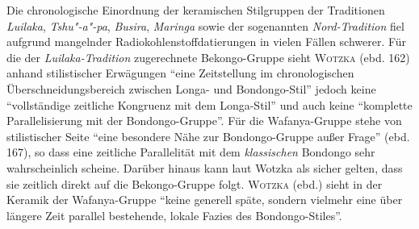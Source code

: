 Die chronologische Einordnung der keramischen Stilgruppen der Traditionen \textit{Luilaka}, \textit{Tshu"-a"-pa}, \textit{Busira}, \textit{Maringa} sowie der sogenannten \textit{Nord-Tradition} \parencite[221--224]{Wotzka.1995} fiel aufgrund mangelnder Radiokohlenstoffdatierungen in vielen Fällen schwerer. Für die der \textit{Luilaka-Tradition} zugerechnete Bekongo-Gruppe sieht \textsc{Wotzka} (ebd. 162) anhand stilistischer Erwägungen \enquote{eine Zeitstellung im chronologischen Überschneidungsbereich zwischen Longa- und Bondongo-Stil} jedoch keine \enquote{vollständige zeitliche Kongruenz mit dem Longa-Stil} und auch keine \enquote{komplette Parallelisierung mit der Bondongo-Gruppe}. Für die Wafanya-Gruppe stehe von stilistischer Seite \enquote{eine besondere Nähe zur Bondongo-Gruppe außer Frage} (ebd. 167), so dass eine zeitliche Parallelität mit dem \textit{klassischen} Bondongo sehr wahrscheinlich scheine. Darüber hinaus kann laut Wotzka als sicher gelten, dass sie zeitlich direkt auf die Bekongo-Gruppe folgt. \textsc{Wotzka} (ebd.) sieht in der Keramik der Wafanya-Gruppe \enquote{keine generell späte, sondern vielmehr eine über längere Zeit parallel bestehende, lokale Fazies des Bondongo-Stiles}. 

